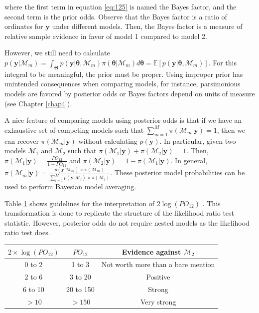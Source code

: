 where the first term in equation \ref{eq:125} is named the Bayes factor, and the second term is the prior odds. Observe that the Bayes factor is a ratio of ordinates for $\mathbf{y}$ under different models. Then, the Bayes factor is a measure of relative sample evidence in favor of model 1 compared to model 2. 

However, we still need to calculate $p(\mathbf{y}|\mathcal{M}_m)=\int_{\mathbf{\Theta}}p(\mathbf{y}|\mathbf{\theta},\mathcal{M}_m)\pi(\mathbf{\theta}|\mathcal{M}_m)d\mathbf{\theta}=\mathbb{E}\left[p(\mathbf{y}|\mathbf{\theta},\mathcal{M}_m)\right]$. For this integral to be meaningful, the prior must be proper. Using improper prior has unintended consequences when comparing models, for instance, parsimonious models are favored by posterior odds or Bayes factors depend on units of measure (see Chapter \ref{chap4}). 

A nice feature of comparing models using posterior odds is that if we have an exhaustive set of competing models such that $\sum_{m=1}^M \pi(\mathcal{M}_m|\mathbf{y})=1$, then we can recover $\pi(\mathcal{M}_m|\mathbf{y})$ without calculating $p(\mathbf{y})$. In particular, given two models $\mathcal{M}_1$ and $\mathcal{M}_2$ such that $\pi(\mathcal{M}_1|\mathbf{y})+\pi(\mathcal{M}_2|\mathbf{y})=1$. Then, $\pi(\mathcal{M}_1|\mathbf{y})=\frac{PO_{12}}{1+PO_{12}}$ and $\pi(\mathcal{M}_2|\mathbf{y})=1-\pi(\mathcal{M}_1|\mathbf{y})$. In general, $\pi(\mathcal{M}_m|\mathbf{y})=\frac{p(\mathbf{y}|\mathcal{M}_m)\times \pi(\mathcal{M}_m)}{\sum_{l=1}^M p(\mathbf{y}|\mathcal{M}_l)\times \pi(\mathcal{M}_l)}$. These posterior model probabilities can be used to perform Bayesian model averaging.

Table \ref{tab:guide} shows guidelines for the interpretation of $2\log(PO_{12})$ \cite{Kass1995}. This transformation is done to replicate the structure of the likelihood ratio test statistic. However, posterior odds do not require nested models as the likelihood ratio test does.

\begin{table}%
	\label{tab:guide}%
	\begin{tabular}{ccc}
		\textbf{$2\times\log(PO_{12})$}    & \textbf{$PO_{12}$} & \textbf{Evidence against $\mathcal{M}_2$} \\
		\hline
		0 to 2 & 1 to 3 & Not worth more than a bare mention\\
		2 to 6 & 3 to 20 & Positive\\
		6 to 10 & 20 to 150 & Strong\\
		$> 10$  & $> 150$ & Very strong\\
	\end{tabular}
\end{table}

